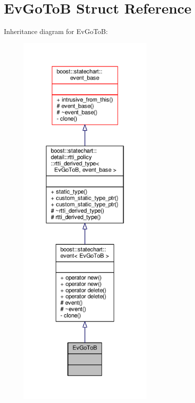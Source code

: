\hypertarget{struct_ev_go_to_b}{}\section{Ev\+Go\+ToB Struct Reference}
\label{struct_ev_go_to_b}


Inheritance diagram for Ev\+Go\+ToB\+:
\nopagebreak
\begin{figure}[H]
\begin{center}
\leavevmode
\includegraphics[height=550pt]{struct_ev_go_to_b__inherit__graph}
\end{center}
\end{figure}


